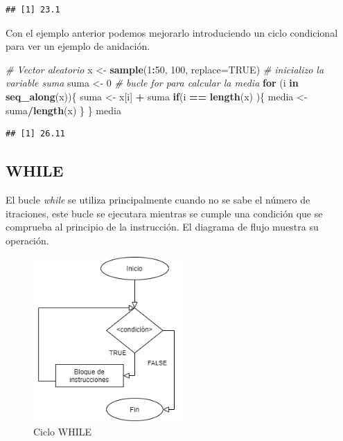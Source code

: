 \documentclass[11pt,]{article}
\newenvironment{Shaded}{\begin{snugshade}}{\end{snugshade}}
\newcommand{\CommentTok}[1]{\textcolor[rgb]{0.56,0.35,0.01}{\textit{#1}}}
\newcommand{\ControlFlowTok}[1]{\textcolor[rgb]{0.13,0.29,0.53}{\textbf{#1}}}
\newcommand{\DataTypeTok}[1]{\textcolor[rgb]{0.13,0.29,0.53}{#1}}
\newcommand{\DecValTok}[1]{\textcolor[rgb]{0.00,0.00,0.81}{#1}}
\newcommand{\KeywordTok}[1]{\textcolor[rgb]{0.13,0.29,0.53}{\textbf{#1}}}
\newcommand{\NormalTok}[1]{#1}
\newcommand{\OperatorTok}[1]{\textcolor[rgb]{0.81,0.36,0.00}{\textbf{#1}}}
\newcommand{\OtherTok}[1]{\textcolor[rgb]{0.56,0.35,0.01}{#1}}
\newcommand{\StringTok}[1]{\textcolor[rgb]{0.31,0.60,0.02}{#1}}
\begin{document}
\begin{verbatim}
## [1] 23.1
\end{verbatim}

Con el ejemplo anterior podemos mejorarlo introduciendo un ciclo
condicional para ver un ejemplo de anidación.

\begin{Shaded}
\begin{Highlighting}[]
\CommentTok{# Vector aleatorio}
\NormalTok{x <-}\StringTok{ }\KeywordTok{sample}\NormalTok{(}\DecValTok{1}\OperatorTok{:}\DecValTok{50}\NormalTok{, }\DecValTok{100}\NormalTok{, }\DataTypeTok{replace=}\OtherTok{TRUE}\NormalTok{)}
\CommentTok{# inicializo la variable suma}
\NormalTok{suma <-}\StringTok{ }\DecValTok{0}
\CommentTok{# bucle for para calcular la media}
\ControlFlowTok{for}\NormalTok{ (i }\ControlFlowTok{in} \KeywordTok{seq_along}\NormalTok{(x))\{}
\NormalTok{  suma <-}\StringTok{ }\NormalTok{x[i] }\OperatorTok{+}\StringTok{ }\NormalTok{suma}
  \ControlFlowTok{if}\NormalTok{(i }\OperatorTok{==}\StringTok{ }\KeywordTok{length}\NormalTok{(x) )\{}
\NormalTok{    media <-}\StringTok{ }\NormalTok{suma}\OperatorTok{/}\KeywordTok{length}\NormalTok{(x)}
\NormalTok{  \}}
\NormalTok{\}}
\NormalTok{media}
\end{Highlighting}
\end{Shaded}

\begin{verbatim}
## [1] 26.11
\end{verbatim}

\hypertarget{while}{%
\subsection{WHILE}\label{while}}

El bucle \emph{while} se utiliza principalmente cuando no se sabe el
número de itraciones, este bucle se ejecutara mientras se cumple una
condición que se comprueba al principio de la instrucción. El diagrama
de flujo muestra su operación.

\begin{figure}
\hypertarget{id}{%
\centering
\includegraphics[width=0.5\textwidth,height=0.3\textheight]{../schemas/WHILE.png}
\caption{Ciclo WHILE}\label{id}
}
\end{figure}
\end{document}
